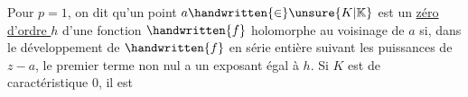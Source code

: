 Pour $p=1$, on dit qu'un point $a\handwritten{\in}\unsure{K|\mathbb{K}}$ est un \uline{zéro d'ordre $h$} d'une fonction $\handwritten{f}$ holomorphe au voisinage de $a$ si, dans le développement de $\handwritten{f}$ en série entière suivant les puissances de $z-a$, le premier terme non nul a un exposant égal à $h$. Si $K$ est de caractéristique $0$, il est
